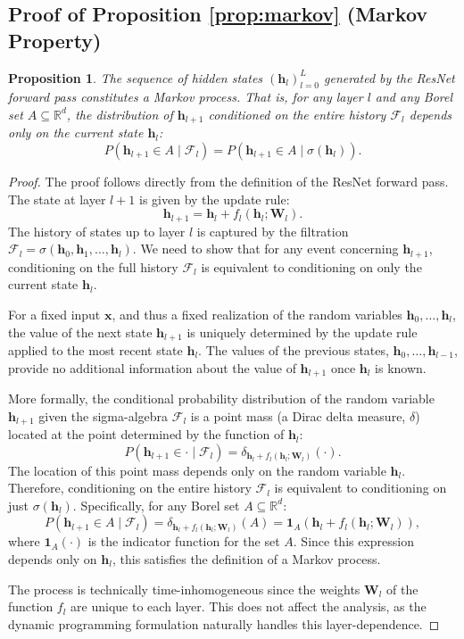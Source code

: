 \documentclass[12pt]{imsart}
\newcommand{\R}{\mathbb{R}}
\newcommand{\F}{\mathcal{F}}
\newcommand{\h}{\mathbf{h}}
\newcommand{\x}{\mathbf{x}}
\newcommand{\W}{\mathbf{W}}
\theoremstyle{plain}
\newtheorem{proposition}[theorem]{Proposition}
\theoremstyle{definition}
\begin{document}
\subsection{Proof of Proposition \ref{prop:markov} (Markov Property)}

\begin{proposition}
The sequence of hidden states $(\h_l)_{l=0}^L$ generated by the ResNet forward pass constitutes a Markov process. That is, for any layer $l$ and any Borel set $A \subseteq \R^d$, the distribution of $\h_{l+1}$ conditioned on the entire history $\F_l$ depends only on the current state $\h_l$:
\[ P(\h_{l+1} \in A \mid \F_l) = P(\h_{l+1} \in A \mid \sigma(\h_l)). \]
\end{proposition}

\begin{proof}
The proof follows directly from the definition of the ResNet forward pass. The state at layer $l+1$ is given by the update rule:
\begin{equation}
\h_{l+1} = \h_l + f_l(\h_l; \W_l).
\end{equation}
The history of states up to layer $l$ is captured by the filtration $\F_l = \sigma(\h_0, \h_1, \dots, \h_l)$. We need to show that for any event concerning $\h_{l+1}$, conditioning on the full history $\F_l$ is equivalent to conditioning on only the current state $\h_l$.

For a fixed input $\x$, and thus a fixed realization of the random variables $\h_0, \dots, \h_l$, the value of the next state $\h_{l+1}$ is uniquely determined by the update rule applied to the most recent state $\h_l$. The values of the previous states, $\h_0, \dots, \h_{l-1}$, provide no additional information about the value of $\h_{l+1}$ once $\h_l$ is known.

More formally, the conditional probability distribution of the random variable $\h_{l+1}$ given the sigma-algebra $\F_l$ is a point mass (a Dirac delta measure, $\delta$) located at the point determined by the function of $\h_l$:
\[ P(\h_{l+1} \in \cdot \mid \F_l) = \delta_{\h_l + f_l(\h_l; \W_l)}(\cdot). \]
The location of this point mass depends only on the random variable $\h_l$. Therefore, conditioning on the entire history $\F_l$ is equivalent to conditioning on just $\sigma(\h_l)$. Specifically, for any Borel set $A \subseteq \R^d$:
\[ P(\h_{l+1} \in A \mid \F_l) = \delta_{\h_l + f_l(\h_l; \W_l)}(A) = \mathbf{1}_A(\h_l + f_l(\h_l; \W_l)), \]
where $\mathbf{1}_A(\cdot)$ is the indicator function for the set $A$. Since this expression depends only on $\h_l$, this satisfies the definition of a Markov process. 

The process is technically time-inhomogeneous since the weights $\W_l$ of the function $f_l$ are unique to each layer. This does not affect the analysis, as the dynamic programming formulation naturally handles this layer-dependence.
\end{proof}
\end{document}
